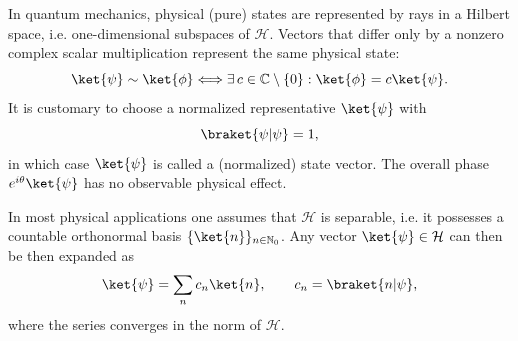 In quantum mechanics, physical (pure) states are represented by rays in a Hilbert space, i.e. one-dimensional subspaces of $\mathcal{H}$. Vectors that differ only by a nonzero complex scalar multiplication represent the same physical state:
\begin{equation}
\ket{\psi}\sim\ket{\phi}\Longleftrightarrow\exists\,c\in\mathbb{C}\setminus\lbrace 0\rbrace:\ket{\phi}=c\ket{\psi}.
\end{equation}
It is customary to choose a normalized representative $\ket{\psi}$ with
\begin{equation}
\braket{\psi\vert\psi}=1,
\end{equation}
in which case $\ket{\psi}$ is called a (normalized) state vector. The overall phase $e^{i\theta}\ket{\psi}$ has no observable physical effect.

In most physical applications one assumes that $\mathcal{H}$ is separable, i.e. it possesses a countable orthonormal basis $\lbrace\ket{n}\rbrace_{n\in\mathbb{N}_0}$. Any vector $\ket{\psi}\in\mathcal{H}$ can then be then expanded as
\begin{equation}
\ket{\psi}=\sum_{n}c_n\ket{n},\qquad c_n=\braket{n\vert\psi},
\end{equation}
where the series converges in the norm of $\mathcal{H}$.

